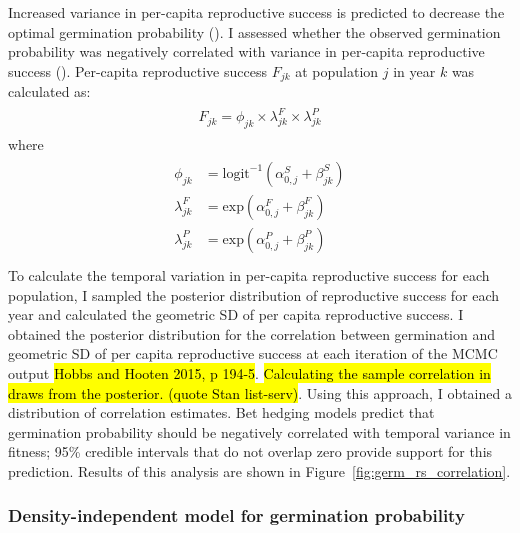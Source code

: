 \documentclass[12pt, oneside, titlepage]{article}   	%
\begin{document}
Increased variance in per-capita reproductive success is predicted to decrease the optimal germination probability (\cite{cohen1966,ellner1985a}). I assessed whether the observed germination probability was negatively correlated with variance in per-capita reproductive success (\cite{venable2007}). Per-capita reproductive success $F_{jk}$ at population $j$ in year $k$ was calculated as:
%
\begin{align}
  \begin{split}
F_{jk} = \phi_{jk} \times \lambda^F_{jk} \times \lambda^P_{jk} \label{eq:percapitars}
  \end{split}
\end{align}
%
where
%
\begin{align}
  \begin{split}
\phi_{jk} & = \mathrm{logit}^{-1}(\alpha^S_{0,j} + \beta^S_{jk}) \\
\lambda^F_{jk} & = \mathrm{exp}(\alpha^F_{0,j} + \beta^F_{jk}) \\
\lambda^P_{jk} & = \mathrm{exp}(\alpha^P_{0,j} + \beta^P_{jk}) \\
  \end{split}
\end{align}
%
To calculate the temporal variation in per-capita reproductive success for each population, I sampled the posterior distribution of reproductive success for each year and calculated the geometric SD of per capita reproductive success. I obtained the posterior distribution for the correlation between germination and geometric SD of per capita reproductive success at each iteration of the MCMC output \hl{Hobbs and Hooten 2015, p 194-5}. \hl{Calculating the sample correlation in draws from the posterior. (quote Stan list-serv)}. Using this approach, I obtained a distribution of correlation estimates. Bet hedging models predict that germination probability should be negatively correlated with temporal variance in fitness; 95\% credible intervals that do not overlap zero provide support for this prediction. Results of this analysis are shown in Figure~\ref{fig:germ_rs_correlation}.

\subsubsection*{Density-independent model for germination probability}
\end{document}

